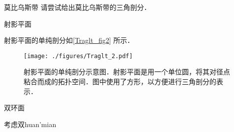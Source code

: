 \begin{exercise}{莫比乌斯带}
请尝试给出莫比乌斯带的三角剖分．
\end{exercise}


\begin{example}{射影平面}

射影平面的单纯剖分如\autoref{Traglt_fig2} 所示．

\begin{figure}[ht]
\centering
\texttt{[image: ./figures/Traglt\_2.pdf]}
\caption{射影平面的单纯剖分示意图．射影平面是用一个单位圆，将其对径点粘合而成的拓扑空间．图中使用了方形，以方便进行三角剖分的表示．} \label{Traglt_fig2}
\end{figure}

\end{example}

\begin{example}{双环面}

考虑双huan'mian




\end{example}







